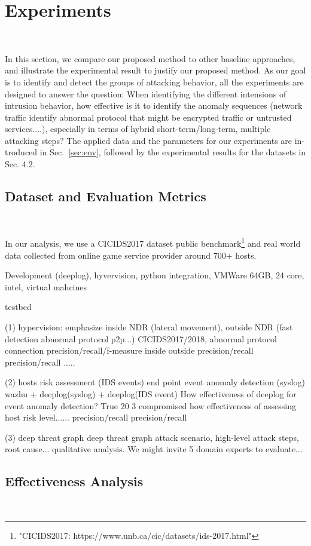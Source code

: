 \section{Experiments}~\label{sec:exps}

In this section, we compare our proposed method to other baseline approaches, and illustrate the experimental result to justify our proposed method. As our goal is to identify and detect the groups of attacking behavior, all the experiments are designed to answer the question: When identifying the different intensions of intrusion behavior, how effective is it to identify the anomaly sequences (network traffic identify abnormal protocol that might be encrypted traffic or untrusted services....), especially in terms of hybrid short-term/long-term, multiple attacking steps? The applied data and the parameters for our experiments are in- troduced in Sec.~\ref{sec:env}, followed by the experimental results for the datasets in Sec. 4.2.

\subsection{Dataset and Evaluation Metrics}~\label{sec:env}

In our analysis, we use a CICIDS2017 dataset public benchmark\footnote{"CICIDS2017: https://www.unb.ca/cic/datasets/ids-2017.html"} and real world data collected from online game service provider around 700+ hosts.  

Development (deeplog), hyvervision, python integration, VMWare 64GB, 24 core, intel, virtual mahcines

testbed

(1) hypervision: emphasize inside NDR (lateral movement), outside NDR (fast detection abnormal protocol p2p...)  CICIDS2017/2018, abnormal protocol connection precision/recall/f-measure
inside outside
precision/recall precision/recall
.....

(2) hosts risk assessment (IDS events) end point event anomaly detection (syslog)
wazhu + deeplog(syslog) + deeplog(IDS event)
How effectiveness of deeplog for event anomaly detection?
True 
20 3 compromised
how effectiveness of assessing host risk level......
precision/recall precision/recall

(3)  deep threat graph
deep threat graph attack scenario, high-level attack steps, root cause...
qualitative analysis. We might invite 5 domain experts to evaluate...

\subsection{Effectiveness Analysis}~\label{sec:effect}

